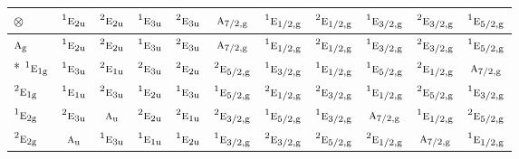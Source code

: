 \documentclass[10pt,a4paper]{article}
\numberwithin{equation}{section}
\newcommand{\irr}[1]{\text{\normalfont\scshape #1}}
\newcommand{\conjpair}[1]{{}^{#1}}
\newcommand{\ptag}[1]{\mathrm{#1}}
\newcommand{\irrprod}{\otimes}
\begin{document}
{\small\setlength{\tabcolsep}{3pt}\begin{longtable}{@{}lcccccccccc@{}}\toprule
$\irrprod$ & $\conjpair{1}\irr{e}_{2\ptag{u}}$ & $\conjpair{2}\irr{e}_{2\ptag{u}}$ & $\conjpair{1}\irr{e}_{3\ptag{u}}$ & $\conjpair{2}\irr{e}_{3\ptag{u}}$ & $\irr{a}_{7/2,\ptag{g}}$ & $\conjpair{1}\irr{e}_{1/2,\ptag{g}}$ & $\conjpair{2}\irr{e}_{1/2,\ptag{g}}$ & $\conjpair{1}\irr{e}_{3/2,\ptag{g}}$ & $\conjpair{2}\irr{e}_{3/2,\ptag{g}}$ & $\conjpair{1}\irr{e}_{5/2,\ptag{g}}$\\\midrule\endhead
\bottomrule\endfoot\endlastfoot
$\irr{a}_{\ptag{g}}$ & $\conjpair{1}\irr{e}_{2\ptag{u}}$ & $\conjpair{2}\irr{e}_{2\ptag{u}}$ & $\conjpair{1}\irr{e}_{3\ptag{u}}$ & $\conjpair{2}\irr{e}_{3\ptag{u}}$ & $\irr{a}_{7/2,\ptag{g}}$ & $\conjpair{1}\irr{e}_{1/2,\ptag{g}}$ & $\conjpair{2}\irr{e}_{1/2,\ptag{g}}$ & $\conjpair{1}\irr{e}_{3/2,\ptag{g}}$ & $\conjpair{2}\irr{e}_{3/2,\ptag{g}}$ & $\conjpair{1}\irr{e}_{5/2,\ptag{g}}$\\*
$\conjpair{1}\irr{e}_{1\ptag{g}}$ & $\conjpair{1}\irr{e}_{3\ptag{u}}$ & $\conjpair{2}\irr{e}_{1\ptag{u}}$ & $\conjpair{2}\irr{e}_{3\ptag{u}}$ & $\conjpair{2}\irr{e}_{2\ptag{u}}$ & $\conjpair{2}\irr{e}_{5/2,\ptag{g}}$ & $\conjpair{1}\irr{e}_{3/2,\ptag{g}}$ & $\conjpair{1}\irr{e}_{1/2,\ptag{g}}$ & $\conjpair{1}\irr{e}_{5/2,\ptag{g}}$ & $\conjpair{2}\irr{e}_{1/2,\ptag{g}}$ & $\irr{a}_{7/2,\ptag{g}}$\\
$\conjpair{2}\irr{e}_{1\ptag{g}}$ & $\conjpair{1}\irr{e}_{1\ptag{u}}$ & $\conjpair{2}\irr{e}_{3\ptag{u}}$ & $\conjpair{1}\irr{e}_{2\ptag{u}}$ & $\conjpair{1}\irr{e}_{3\ptag{u}}$ & $\conjpair{1}\irr{e}_{5/2,\ptag{g}}$ & $\conjpair{2}\irr{e}_{1/2,\ptag{g}}$ & $\conjpair{2}\irr{e}_{3/2,\ptag{g}}$ & $\conjpair{1}\irr{e}_{1/2,\ptag{g}}$ & $\conjpair{2}\irr{e}_{5/2,\ptag{g}}$ & $\conjpair{1}\irr{e}_{3/2,\ptag{g}}$\\
$\conjpair{1}\irr{e}_{2\ptag{g}}$ & $\conjpair{2}\irr{e}_{3\ptag{u}}$ & $\irr{a}_{\ptag{u}}$ & $\conjpair{2}\irr{e}_{2\ptag{u}}$ & $\conjpair{2}\irr{e}_{1\ptag{u}}$ & $\conjpair{2}\irr{e}_{3/2,\ptag{g}}$ & $\conjpair{1}\irr{e}_{5/2,\ptag{g}}$ & $\conjpair{1}\irr{e}_{3/2,\ptag{g}}$ & $\irr{a}_{7/2,\ptag{g}}$ & $\conjpair{1}\irr{e}_{1/2,\ptag{g}}$ & $\conjpair{2}\irr{e}_{5/2,\ptag{g}}$\\
$\conjpair{2}\irr{e}_{2\ptag{g}}$ & $\irr{a}_{\ptag{u}}$ & $\conjpair{1}\irr{e}_{3\ptag{u}}$ & $\conjpair{1}\irr{e}_{1\ptag{u}}$ & $\conjpair{1}\irr{e}_{2\ptag{u}}$ & $\conjpair{1}\irr{e}_{3/2,\ptag{g}}$ & $\conjpair{2}\irr{e}_{3/2,\ptag{g}}$ & $\conjpair{2}\irr{e}_{5/2,\ptag{g}}$ & $\conjpair{2}\irr{e}_{1/2,\ptag{g}}$ & $\irr{a}_{7/2,\ptag{g}}$ & $\conjpair{1}\irr{e}_{1/2,\ptag{g}}$\\

\end{longtable}}
\end{document}

